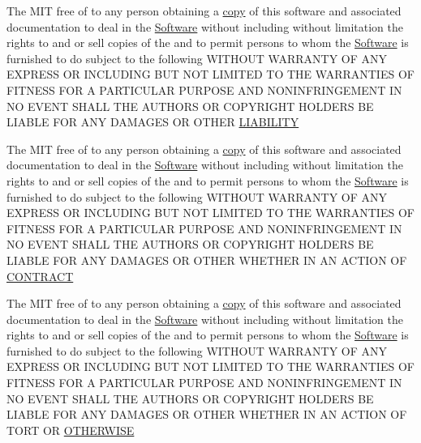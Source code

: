 \begin{DoxyCompactItemize}
The M\+IT free of to any person obtaining a \hyperlink{LICENSE_8txt_aff1d4c6b756ebf691fa44a0904f68658}{copy} of this software and associated documentation to deal in the \hyperlink{LICENSE_8txt_a22a1529885b3e9d66b0c72fe604fc3dc}{Software} without including without limitation the rights to and or sell copies of the and to permit persons to whom the \hyperlink{LICENSE_8txt_a22a1529885b3e9d66b0c72fe604fc3dc}{Software} is furnished to do subject to the following W\+I\+T\+H\+O\+UT W\+A\+R\+R\+A\+N\+TY OF A\+NY E\+X\+P\+R\+E\+SS OR I\+N\+C\+L\+U\+D\+I\+NG B\+UT N\+OT L\+I\+M\+I\+T\+ED TO T\+HE W\+A\+R\+R\+A\+N\+T\+I\+ES OF F\+I\+T\+N\+E\+SS F\+OR A P\+A\+R\+T\+I\+C\+U\+L\+AR P\+U\+R\+P\+O\+SE A\+ND N\+O\+N\+I\+N\+F\+R\+I\+N\+G\+E\+M\+E\+NT IN NO E\+V\+E\+NT S\+H\+A\+LL T\+HE A\+U\+T\+H\+O\+RS OR C\+O\+P\+Y\+R\+I\+G\+HT H\+O\+L\+D\+E\+RS BE L\+I\+A\+B\+LE F\+OR A\+NY D\+A\+M\+A\+G\+ES OR O\+T\+H\+ER \hyperlink{LICENSE_8txt_a154c0f6f925190567752588d1ff5458f}{L\+I\+A\+B\+I\+L\+I\+TY}
\item 
The M\+IT free of to any person obtaining a \hyperlink{LICENSE_8txt_aff1d4c6b756ebf691fa44a0904f68658}{copy} of this software and associated documentation to deal in the \hyperlink{LICENSE_8txt_a22a1529885b3e9d66b0c72fe604fc3dc}{Software} without including without limitation the rights to and or sell copies of the and to permit persons to whom the \hyperlink{LICENSE_8txt_a22a1529885b3e9d66b0c72fe604fc3dc}{Software} is furnished to do subject to the following W\+I\+T\+H\+O\+UT W\+A\+R\+R\+A\+N\+TY OF A\+NY E\+X\+P\+R\+E\+SS OR I\+N\+C\+L\+U\+D\+I\+NG B\+UT N\+OT L\+I\+M\+I\+T\+ED TO T\+HE W\+A\+R\+R\+A\+N\+T\+I\+ES OF F\+I\+T\+N\+E\+SS F\+OR A P\+A\+R\+T\+I\+C\+U\+L\+AR P\+U\+R\+P\+O\+SE A\+ND N\+O\+N\+I\+N\+F\+R\+I\+N\+G\+E\+M\+E\+NT IN NO E\+V\+E\+NT S\+H\+A\+LL T\+HE A\+U\+T\+H\+O\+RS OR C\+O\+P\+Y\+R\+I\+G\+HT H\+O\+L\+D\+E\+RS BE L\+I\+A\+B\+LE F\+OR A\+NY D\+A\+M\+A\+G\+ES OR O\+T\+H\+ER W\+H\+E\+T\+H\+ER IN AN A\+C\+T\+I\+ON OF \hyperlink{LICENSE_8txt_a808df707d490e1041f54a1d24fbbfaa0}{C\+O\+N\+T\+R\+A\+CT}
\item 
The M\+IT free of to any person obtaining a \hyperlink{LICENSE_8txt_aff1d4c6b756ebf691fa44a0904f68658}{copy} of this software and associated documentation to deal in the \hyperlink{LICENSE_8txt_a22a1529885b3e9d66b0c72fe604fc3dc}{Software} without including without limitation the rights to and or sell copies of the and to permit persons to whom the \hyperlink{LICENSE_8txt_a22a1529885b3e9d66b0c72fe604fc3dc}{Software} is furnished to do subject to the following W\+I\+T\+H\+O\+UT W\+A\+R\+R\+A\+N\+TY OF A\+NY E\+X\+P\+R\+E\+SS OR I\+N\+C\+L\+U\+D\+I\+NG B\+UT N\+OT L\+I\+M\+I\+T\+ED TO T\+HE W\+A\+R\+R\+A\+N\+T\+I\+ES OF F\+I\+T\+N\+E\+SS F\+OR A P\+A\+R\+T\+I\+C\+U\+L\+AR P\+U\+R\+P\+O\+SE A\+ND N\+O\+N\+I\+N\+F\+R\+I\+N\+G\+E\+M\+E\+NT IN NO E\+V\+E\+NT S\+H\+A\+LL T\+HE A\+U\+T\+H\+O\+RS OR C\+O\+P\+Y\+R\+I\+G\+HT H\+O\+L\+D\+E\+RS BE L\+I\+A\+B\+LE F\+OR A\+NY D\+A\+M\+A\+G\+ES OR O\+T\+H\+ER W\+H\+E\+T\+H\+ER IN AN A\+C\+T\+I\+ON OF T\+O\+RT OR \hyperlink{LICENSE_8txt_ae4c7c54aef6c135b4520f2237dbcf7c6}{O\+T\+H\+E\+R\+W\+I\+SE}

\end{DoxyCompactItemize}
